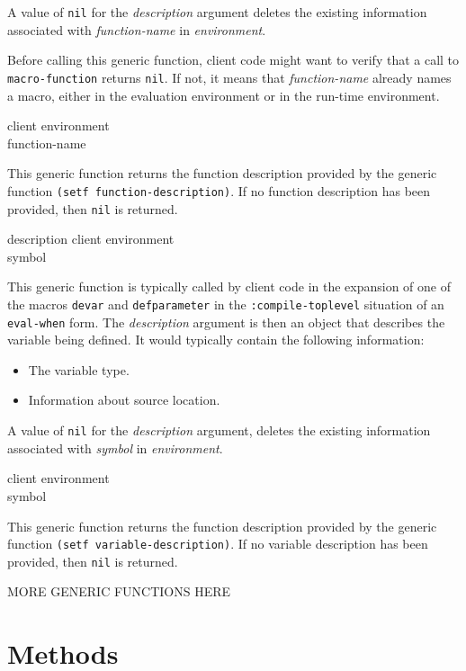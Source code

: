 A value of \texttt{nil} for the \textit{description} argument deletes
the existing information associated with \textit{function-name} in
\textit{environment}.

Before calling this generic function, client code might want to verify
that a call to \texttt{macro-function} returns \texttt{nil}.  If not,
it means that \textit{function-name} already names a macro, either in
the evaluation environment or in the run-time environment.

 {client environment \\ function-name}

This generic function returns the function description provided by the
generic function \texttt{(setf function-description)}.  If no function
description has been provided, then \texttt{nil} is returned.

{\small{} {description client environment \\
symbol}
}

This generic function is typically called by client code in the
expansion of one of the macros \texttt{devar} and
\texttt{defparameter} in the \texttt{:compile-toplevel} situation of an
\texttt{eval-when} form.  The \textit{description} argument is then an
object that describes the variable being defined.  It would typically
contain the following information:

\begin{itemize}
\item The variable type.
\item Information about source location.
\end{itemize}

A value of \texttt{nil} for the \textit{description} argument, deletes
the existing information associated with \textit{symbol} in
\textit{environment}.

 {client environment \\ symbol}

This generic function returns the function description provided by the
generic function \texttt{(setf variable-description)}.  If no variable
description has been provided, then \texttt{nil} is returned.

MORE GENERIC FUNCTIONS HERE

\section{Methods}


